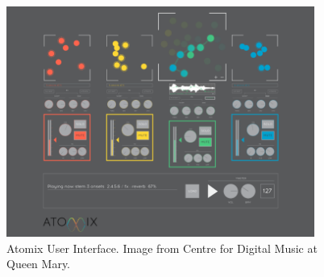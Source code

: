 \begin{figure}
	\begin{center}
		\includegraphics[width=0.9\textwidth]{ch99/figures/atomix.png}
	\end{center}
	\caption[Atomix User Interface]{Atomix User Interface. Image from Centre for Digital Music at Queen Mary.}
	\label{fig:atomix}
\end{figure}



